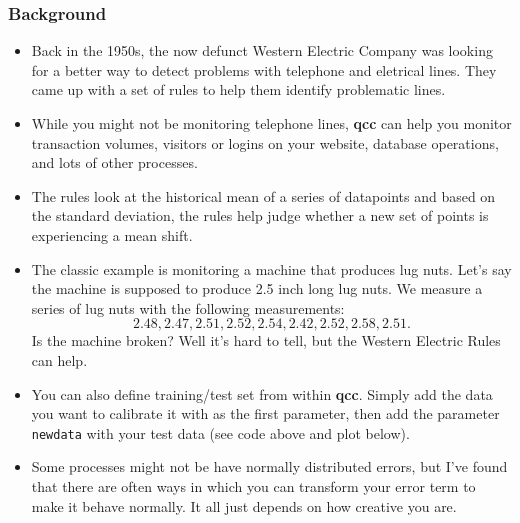 \documentclass[a4paper,12pt]{article}
\begin{document}
\subsubsection{Background}
\begin{itemize}
\item Back in the 1950s, the now defunct Western Electric Company was looking for a better way to detect problems with telephone and eletrical lines. They came up with a set of rules to help them identify problematic lines. 
\item While you might not be monitoring telephone lines, \textbf{qcc} can help you monitor transaction volumes, visitors or logins on your website, database operations, and lots of other processes.
\item The rules look at the historical mean of a series of datapoints and based on the standard deviation, the rules help judge whether a new set of points is experiencing a mean shift.
\item The classic example is monitoring a machine that produces lug nuts. Let's say the machine is supposed to produce 2.5 inch long lug nuts. We measure a series of lug nuts with the following measurements: \[2.48, 2.47, 2.51, 2.52, 2.54, 2.42, 2.52, 2.58, 2.51.\] Is the machine broken? Well it's hard to tell, but the Western Electric Rules can help.

\item You can also define training/test set from within \textbf{qcc}. Simply add the data you want to calibrate it with as the first parameter, then add the parameter \texttt{newdata} with your test data (see code above and plot below).


\item Some processes might not be have normally distributed errors, but I've found that there are often ways in which you can transform your error term to make it behave normally. It all just depends on how creative you are.
\end{itemize}
\newpage

\end{document}
